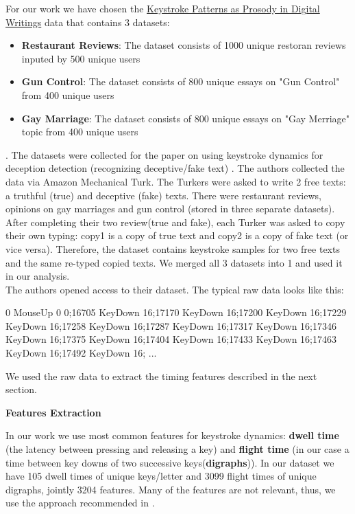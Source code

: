\documentclass[12pt,a4]{article}
\begin{document}
\normalsize
For our work we have chosen the  \href{http://www3.cs.stonybrook.edu/~rbanerjee/project-pages/keystrokes/keystrokes.html}{Keystroke Patterns as Prosody in Digital Writings} data \cite{banerjee2014_emnlp} that contains 3 datasets: \begin{itemize}
	\item \textbf{Restaurant Reviews}: The dataset consists of 1000 unique restoran reviews inputed by 500 unique users
	\item \textbf{Gun Control}: The dataset consists of 800 unique essays on "Gun Control" from 400 unique users
	\item \textbf{Gay Marriage}: The dataset consists of 800 unique essays on "Gay Merriage" topic  from 400 unique users
\end{itemize}.
The datasets were collected for the paper on using keystroke dynamics for 
deception detection (recognizing deceptive/fake text) \cite{banerjee2014_emnlp}. The authors collected the data via Amazon Mechanical Turk. The Turkers were asked to write 2 free texts: a truthful (true) and deceptive (fake) texts. There were restaurant reviews, opinions on gay marriages and gun control (stored in three separate datasets). After completing their two review(true and fake), each Turker was asked to copy their own typing: copy1 is a copy of true text and copy2 is a copy of fake text (or vice versa). Therefore, the dataset contains keystroke samples for two free texts and the same re-typed copied texts. We merged all 3 datasets into 1 and used it in our analysis. \\

The authors opened access to their dataset. The typical raw data looks like this: 
\bigskip

\begin{text}
	0 MouseUp 0 0;16705 KeyDown 16;17170 KeyDown 16;17200 KeyDown 16;17229 KeyDown 16;17258 KeyDown 16;17287 KeyDown 16;17317 KeyDown 16;17346 KeyDown 16;17375 KeyDown 16;17404 KeyDown 16;17433 KeyDown 16;17463 KeyDown 16;17492 KeyDown 16; ...
\end{text}
\bigskip

We used the raw data to extract the timing features described in the next section.

\bigskip
\large\textbf{Features Extraction}
\bigskip

\normalsize

In our work we use most common features for keystroke dynamics: \textbf{dwell time} (the latency between pressing and releasing a key) and \textbf{flight time} (in our case a time between key downs of two successive keys(\textbf{digraphs})). In our dataset we have 105 dwell times of unique keys/letter and 3099 flight times of unique digraphs, jointly 3204 features. Many of the features are not relevant, thus, we use the approach recommended in \cite{tappert2012keystroke}. \\
\end{document}
